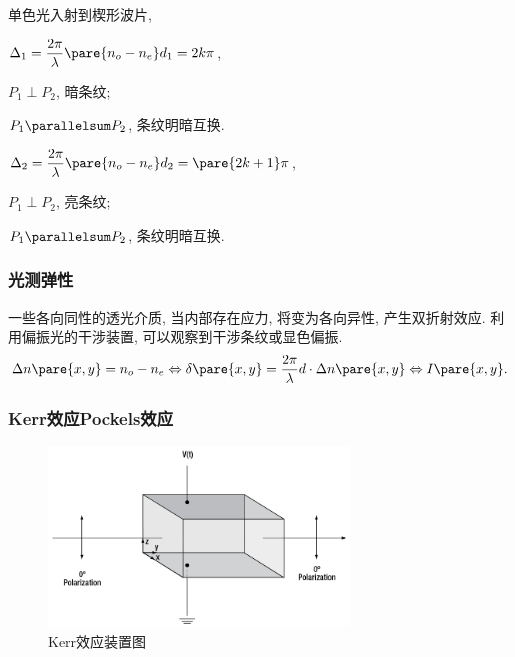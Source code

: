 \documentclass{ctexart}
\begin{document}
单色光入射到楔形波片,
\begin{cenum}
    \item $\displaystyle \Delta_1 = \frac{2\pi}{\lambda}\pare{n_o - n_e}d_1 = 2k\pi$,
    \begin{cenum}
        \item $P_1\perp P_2$, 暗条纹;
        \item $P_1\parallelsum P_2$, 条纹明暗互换.
    \end{cenum}
    \item $\displaystyle \Delta_2 = \frac{2\pi}{\lambda}\pare{n_o - n_e}d_2 = \pare{2k+1}\pi$,
    \begin{cenum}
        \item $P_1\perp P_2$, 亮条纹;
        \item $P_1\parallelsum P_2$, 条纹明暗互换.
    \end{cenum}
\end{cenum}


\subsubsection{光测弹性} %
\label{ssub:光测弹性}

一些各向同性的透光介质, 当内部存在应力, 将变为各向异性, 产生双折射效应. 利用偏振光的干涉装置, 可以观察到干涉条纹或显色偏振.
\[ \Delta n\pare{x,y} = n_o - n_e \Leftrightarrow \delta\pare{x,y} = \frac{2\pi}{\lambda}d\cdot \Delta n\pare{x,y} \Leftrightarrow I\pare{x,y}. \]


\subsubsection{Kerr效应Pockels效应} %
\label{sub:kerr效应pockels效应}

\begin{figure}[ht]
    \centering
    \includegraphics[width=8cm]{src/ElectroOpticKerr.png}
    \caption{Kerr效应装置图}
\end{figure}
\end{document}
